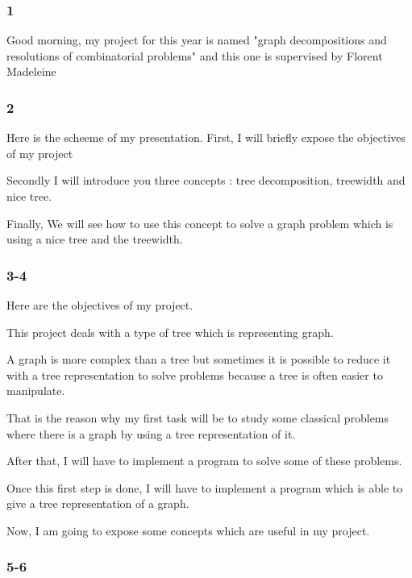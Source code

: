 \documentclass[a4paper, 10pt,french,landscape]{article}
\begin{document}
\begin{multicols}{3}

\subsubsection*{ 1 }

Good morning,
my project for this year is named "graph decompositions and resolutions of combinatorial problems" 
and this one is supervised by Florent Madeleine

\subsubsection*{ 2}

Here is the scheeme of my presentation. 
First, I will briefly expose the objectives of my project

Secondly I will introduce you three concepts : tree decomposition, treewidth and nice tree.

Finally, We will see how to use this concept to solve a graph problem which is using a nice tree and the treewidth.


\subsubsection*{ 3-4}



Here are the objectives of my project.

This project deals with a type of tree which is representing graph.

 A graph is more complex than a tree but sometimes it is possible to reduce it with a tree representation to solve problems because a tree is often easier to manipulate.

That is the reason why my first task will be to study some classical problems where there is a graph by using a tree representation of it.

After that, I will have to implement a program to solve some of these problems.

Once this first step is done, I will have to implement a program which is able to give a tree representation of a graph.

Now, I am going to expose some concepts which are useful in my project.



\subsubsection*{ 5-6}





\end{multicols}
\end{document}
